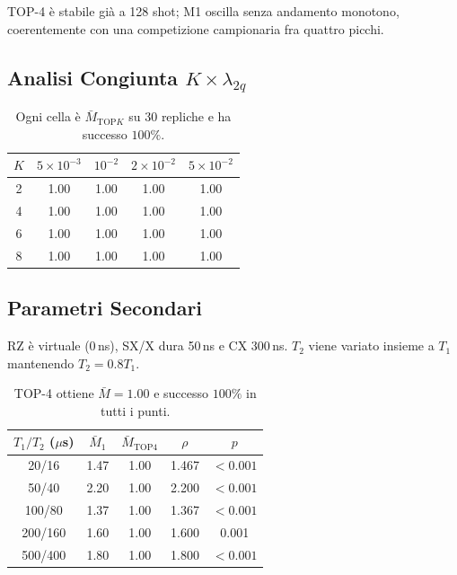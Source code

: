 \begin{onehalfspace}
TOP-4 è stabile già a 128 shot; M1 oscilla senza andamento monotono,
coerentemente con una competizione campionaria fra quattro picchi.

\subsection{Analisi Congiunta $K\times\lambda_{2q}$}
\label{subsec:sweep_joint}

\begin{table}[H]
\centering
\caption[Griglia $K\times\lambda_{2q}$]{Ogni cella è
$\bar M_{\mathrm{TOP}K}$ su 30 repliche e ha successo $100\%$.}
\label{tab:sweep_joint}
\begin{tabular}{ccccc}
\toprule
$K$ & $5\times10^{-3}$ & $10^{-2}$ & $2\times10^{-2}$ & $5\times10^{-2}$ \\
\midrule
2 & 1.00 & 1.00 & 1.00 & 1.00 \\
4 & 1.00 & 1.00 & 1.00 & 1.00 \\
6 & 1.00 & 1.00 & 1.00 & 1.00 \\
8 & 1.00 & 1.00 & 1.00 & 1.00 \\
\bottomrule
\end{tabular}
\end{table}

\subsection{Parametri Secondari}
\label{subsec:sweep_secondari}

RZ è virtuale (0\,ns), SX/X dura 50\,ns e CX 300\,ns. $T_2$ viene
variato insieme a $T_1$ mantenendo $T_2=0.8T_1$.

\begin{table}[H]
\centering
\caption[Sweep di $T_1/T_2$]{TOP-4 ottiene $\bar M=1.00$ e successo
$100\%$ in tutti i punti.}
\label{tab:sweep_t1}
\begin{tabular}{ccccc}
\toprule
$T_1/T_2$ ($\mu$s) & $\bar M_1$ & $\bar M_{\mathrm{TOP4}}$ & $\rho$ & $p$ \\
\midrule
20/16 & 1.47 & 1.00 & 1.467 & $<0.001$ \\
50/40 & 2.20 & 1.00 & 2.200 & $<0.001$ \\
100/80 & 1.37 & 1.00 & 1.367 & $<0.001$ \\
200/160 & 1.60 & 1.00 & 1.600 & 0.001 \\
500/400 & 1.80 & 1.00 & 1.800 & $<0.001$ \\
\bottomrule
\end{tabular}
\end{table}


\end{onehalfspace}
